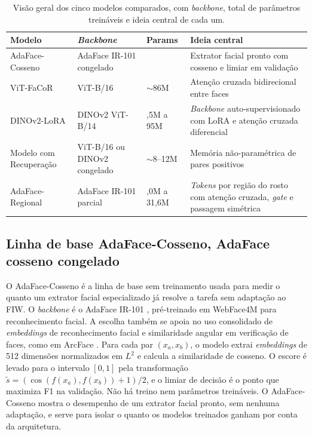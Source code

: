 \begin{table}[h]
\centering
\caption{Visão geral dos cinco modelos comparados, com \textit{backbone}, total de parâmetros treináveis e ideia central de cada um.}
\label{tab:modelos_metodologia}
\small
\setlength{\tabcolsep}{3pt}
\begin{tabularx}{\textwidth}{>{\raggedright\arraybackslash}p{2.45cm} >{\raggedright\arraybackslash}p{2.9cm} >{\centering\arraybackslash}p{1.55cm} X}
\hline
\textbf{Modelo} & \textbf{\textit{Backbone}} & \textbf{Params} & \textbf{Ideia central} \\
\hline
AdaFace-Cosseno & AdaFace IR-101 congelado & 0 & Extrator facial pronto com cosseno e limiar em validação \\
ViT-FaCoR & ViT-B/16 & $\sim$86M & Atenção cruzada bidirecional entre faces \\
DINOv2-LoRA & DINOv2 ViT-B/14 & 8,5M a 95M & \textit{Backbone} auto-supervisionado com LoRA e atenção cruzada diferencial \\
Modelo com Recuperação & ViT-B/16 ou DINOv2 congelado & $\sim$8--12M & Memória não-paramétrica de pares positivos \\
AdaFace-Regional & AdaFace IR-101 parcial & 31,0M a 31,6M & \textit{Tokens} por região do rosto com atenção cruzada, \textit{gate} e passagem simétrica \\
\hline
\end{tabularx}
\end{table}

\subsection{Linha de base AdaFace-Cosseno, AdaFace cosseno congelado}

O AdaFace-Cosseno é a linha de base sem treinamento usada para medir o quanto um extrator facial especializado já resolve a tarefa sem adaptação ao FIW. O \textit{backbone} é o AdaFace IR-101 \cite{kim2022adaface}, pré-treinado em WebFace4M para reconhecimento facial. A escolha também se apoia no uso consolidado de \textit{embeddings} de reconhecimento facial e similaridade angular em verificação de faces, como em ArcFace \cite{deng2019arcface}. Para cada par $(x_a, x_b)$, o modelo extrai \textit{embeddings} de 512 dimensões normalizados em $L^2$ e calcula a similaridade de cosseno. O escore é levado para o intervalo $[0, 1]$ pela transformação $\tilde{s} = (\cos(f(x_a), f(x_b)) + 1)/2$, e o limiar de decisão é o ponto que maximiza F1 na validação. Não há treino nem parâmetros treináveis. O AdaFace-Cosseno mostra o desempenho de um extrator facial pronto, sem nenhuma adaptação, e serve para isolar o quanto os modelos treinados ganham por conta da arquitetura.

